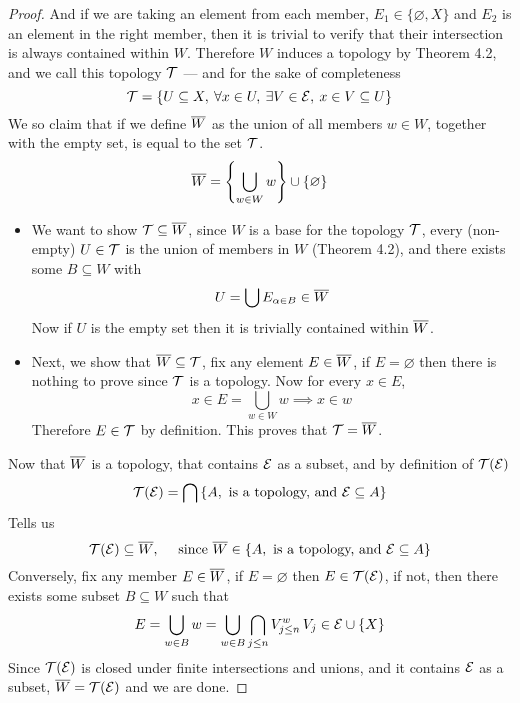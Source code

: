 \documentclass[../../main.tex]{subfiles}
\begin{document}
\begin{proof}
    And if we are taking an element from each member, $E_1\in\{\varnothing,X\}$ and $E_2$ is an element in the right member, then it is trivial to verify that their intersection is always contained within $W$. Therefore $W$ induces a topology by Theorem 4.2, and we call this topology $\mathcal{T}$ — and for the sake of completeness
    \[
    \mathcal{T} = \left\{U\subseteq X,\: \forall x\in U,\:\exists V\in \mathcal{E}, \: x\in V\subseteq U\right\}
    \]
    We so claim that if we define $\overline{W}$ as the union of all members $w\in W$, together with the empty set, is equal to the set $\mathcal{T}$.
    \[
    \overline{W} = \left\{\bigcup_{w\in W}w\right\}\cup\{\varnothing\}
    \]
    \begin{itemize}
        \item We want to show $\mathcal{T}\subseteq\overline{W}$, since $W$ is a base for the topology $\mathcal{T}$, every (non-empty) $U\in \mathcal{T}$ is the union of members in $W$ (Theorem 4.2), and there exists some $B\subseteq W$ with
        \[
        U=\bigcup E_{\alpha\in B}\in \overline{W}
        \]
        Now if $U$ is the empty set then it is trivially contained within $\overline{W}$.
        \item Next, we show that $\overline{W}\subseteq\mathcal{T}$, fix any element $E\in\overline{W}$, if $E=\varnothing$ then there is nothing to prove since $\mathcal{T}$ is a topology. Now for every $x\in E$,
        \[
        x\in E=\bigcup_{w\in W} w\implies x\in w
        \]
        Therefore $E\in \mathcal{T}$ by definition. This proves that $\mathcal{T} = \overline{W}$.
    \end{itemize}
    Now that $\overline{W}$ is a topology, that contains $\mathcal{E}$ as a subset, and by definition of $\mathcal{T}(\mathcal{E})$
    \[
    \mathcal{T}(\mathcal{E}) = \bigcap \left\{A,\text{ is a topology, and } \mathcal{E}\subseteq A \right\}
    \]
    Tells us
    \[
    \mathcal{T}(\mathcal{E}) \subseteq \overline{W}, \quad\text{ since }\overline{W}\in\left\{A,\text{ is a topology, and } \mathcal{E}\subseteq A \right\}
    \]
    Conversely, fix any member $E\in\overline{W}$, if $E=\varnothing$ then $E\in\mathcal{T}(\mathcal{E})$, if not, then there exists some subset $B\subseteq W$ such that
    \[
    E = \bigcup_{w\in B}w=\bigcup_{w\in B} \bigcap_{j\leq n}V_{j\leq n}^w \, V_j\in \mathcal{E}\cup\{X\}
    \]
    Since $\mathcal{T}(\mathcal{E})$ is closed under finite intersections and unions, and it contains $\mathcal{E}$ as a subset, $\overline{W} = \mathcal{T}(\mathcal{E})$ and we are done.
\end{proof}
\end{document}
